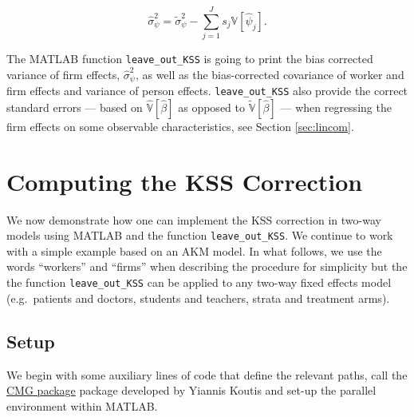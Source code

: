 \documentclass[11pt]{article}
\begin{document}
\begin{equation}
\hat{\sigma}^{2}_{\psi}=\tilde{\sigma}^{2}_{\psi}-\sum_{j=1}^{J}s_{j}{\mathbb{V}[\hat{\psi}_{j}]}.
\end{equation}

The MATLAB function \texttt{leave\_out\_KSS} is going to print the bias
corrected variance of firm effects, \(\hat{\sigma}^{2}_{\psi}\), as well
as the bias-corrected covariance of worker and firm effects and variance
of person effects.  \texttt{leave\_out\_KSS} also provide the correct standard errors --- based on \(\hat{\mathbb{V}}[\hat{\beta}]\)  as opposed to \(\tilde{\mathbb{V}}[\hat{\beta}]\) --- when regressing the firm effects on some observable characteristics, see Section \ref{sec:lincom}.
\hypertarget{computing-the-kss-correction}{%
\section{Computing the KSS
Correction}\label{computing-the-kss-correction}}

We now demonstrate how one can implement the KSS correction in two-way
models using MATLAB and the function \texttt{leave\_out\_KSS}. We
continue to work with a simple example based on an AKM model. In what
follows, we use the words ``workers'' and ``firms'' when describing the
procedure for simplicity but the the function \texttt{leave\_out\_KSS}
can be applied to any two-way fixed effects model (e.g.~patients and doctors,
students and teachers, strata and treatment arms).

\hypertarget{setup}{%
\subsection{Setup}\label{setup}}

We begin with some auxiliary lines of code that define the relevant
paths, call the \href{http://www.cs.cmu.edu/jkoutis/cmg.html}{CMG package} package developed by Yiannis Koutis and set-up the
parallel environment within MATLAB.
\end{document}
